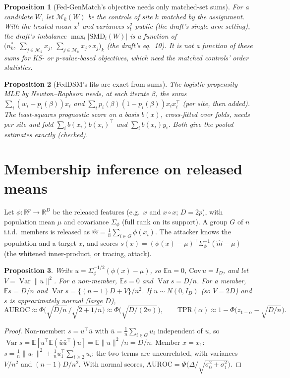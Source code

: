 \documentclass[11pt]{article}
\newtheorem{proposition}{Proposition}
\theoremstyle{remark}
\newcommand{\R}{\mathbb{R}}
\newcommand{\E}{\mathbb{E}}
\DeclareMathOperator{\Var}{Var}
\begin{document}
\begin{proposition}[Fed-GenMatch's objective needs only matched-set sums]
For a candidate $W$, let $\mathcal M_k(W)$ be the controls of site $k$ matched by the
assignment. With the treated mean $\bar x^t$ and variances $s_t^2$ public (the draft's
single-arm setting), the draft's imbalance $\max_l|\mathrm{SMD}_l(W)|$ is a function of
$\big(n_k^*,\ \sum_{j\in\mathcal M_k}x_j,\ \sum_{j\in\mathcal M_k}x_j\circ x_j\big)_{k}$
(the draft's eq.~10). It is not a function of these sums for KS- or $p$-value-based
objectives, which need the matched controls' order statistics.
\end{proposition}

\begin{proposition}[FedDSM's fits are exact from sums]
The logistic propensity MLE by Newton--Raphson needs, at each iterate $\beta$, the sums
$\sum_i(w_i-p_i(\beta))x_i$ and $\sum_i p_i(\beta)(1-p_i(\beta))x_ix_i^\top$ (per site, then
added). The least-squares prognostic score on a basis $b(x)$, cross-fitted over folds, needs
per site and fold $\sum_i b(x_i)b(x_i)^\top$ and $\sum_i b(x_i)y_i$. Both give the pooled
estimates exactly \emph{(checked)}.
\end{proposition}

\section{Membership inference on released means}\label{sec:mia}

Let $\phi:\R^p\to\R^D$ be the released features (e.g.\ $x$ and $x\circ x$; $D=2p$), with
population mean $\mu$ and covariance $\Sigma_\phi$ (full rank on its support). A group $G$ of $n$
i.i.d.\ members is released as $\hat m=\frac1n\sum_{i\in G}\phi(x_i)$. The attacker knows the
population and a target $x$, and scores $s(x)=(\phi(x)-\mu)^\top\Sigma_\phi^{-1}(\hat m-\mu)$
(the whitened inner-product, or tracing, attack).

\begin{proposition}\label{prop:mia}
Write $u=\Sigma_\phi^{-1/2}(\phi(x)-\mu)$, so $\E u=0$, $\mathrm{Cov}\,u=I_D$, and let
$V=\Var\|u\|^2$. For a non-member, $\E s=0$ and $\Var s=D/n$. For a member,
$\E s=D/n$ and $\Var s=\{(n-1)D+V\}/n^2$. If $u\sim N(0,I_D)$ (so $V=2D$) and $s$ is
approximately normal (large $D$),
\[
\mathrm{AUROC}\approx\Phi\!\Big(\sqrt{D/n}\,\big/\sqrt{2+1/n}\Big)\approx\Phi\big(\sqrt{D/(2n)}\big),
\qquad
\mathrm{TPR}(\alpha)\approx1-\Phi\big(z_{1-\alpha}-\sqrt{D/n}\big).
\]
\end{proposition}
\begin{proof}
Non-member: $s=u^\top\bar u$ with $\bar u=\frac1n\sum_{i\in G}u_i$ independent of $u$, so
$\Var s=\E[u^\top\E(\bar u\bar u^\top)u]=\E\|u\|^2/n=D/n$. Member $x=x_1$:
$s=\frac1n\|u_1\|^2+\frac1n u_1^\top\sum_{i\ge2}u_i$; the two terms are uncorrelated, with
variances $V/n^2$ and $(n-1)D/n^2$. With normal scores, $\mathrm{AUROC}=\Phi\big(\Delta/\sqrt{\sigma_0^2+\sigma_1^2}\big)$.
\end{proof}
\end{document}
